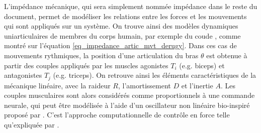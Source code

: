 %
%
%
%

L'impédance mécanique, qui sera simplement nommée impédance dans le reste du document, permet de modéliser les relations entre les forces et les mouvements qui sont appliqués sur un système. On trouve ainsi des modèles dynamiques uniarticulaires de membres du corps humain, par exemple du coude \parencite{de_rugy_actively_2003,avrin_particle_2016}, comme montré sur l'équation \cref{eq_impedance_artic_mvt_derugy}. Dans ces cas de mouvements rythmiques, la position d'une articulation du bras $\theta$ est obtenue à partir des couples appliqués par les muscles agonistes $T_i$ (e.g. biceps) et antagonistes $T_j$ (e.g. triceps). On retrouve ainsi les éléments caractéristiques de la mécanique linéaire, avec la raideur $R$, l'amortissement $D$ et l'inertie $A$. Les couples musculaires sont alors considérés comme proportionnels à une commande neurale, qui peut être modélisée à l'aide d'un oscillateur non linéaire bio-inspiré proposé par \textcite{matsuoka_sustained_1985}. C'est l'approche computationnelle de contrôle en force telle qu'expliquée par \textcite{danion_we_2011}.

